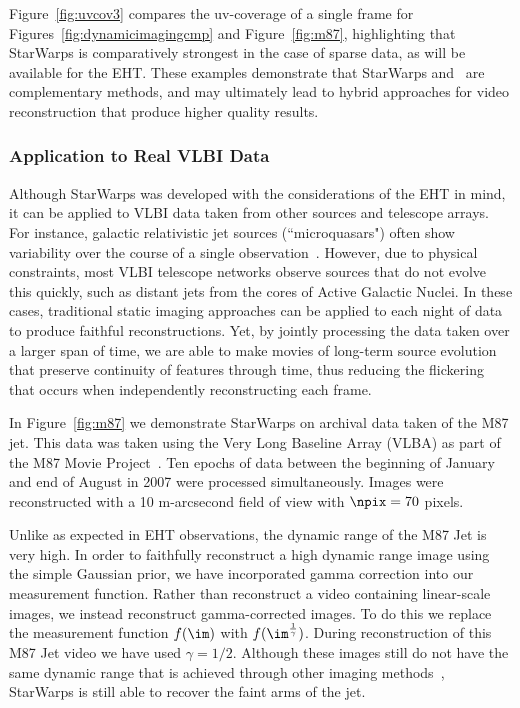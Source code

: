Figure~\ref{fig:uvcov3} compares the uv-coverage of a single frame for Figures~\ref{fig:dynamicimagingcmp} and Figure~\ref{fig:m87}, highlighting that StarWarps is comparatively strongest  in the case of sparse data, as will be available for the EHT. These examples demonstrate that StarWarps and~\cite{Johnson_dynamical} are complementary methods, and may ultimately lead to hybrid approaches for video reconstruction that produce higher quality results. 




 


\subsubsection{Application to Real VLBI Data}


Although StarWarps was developed with the considerations of the EHT in mind, it can be applied to VLBI data taken from other sources and telescope arrays. For instance, galactic relativistic jet sources (``microquasars") often show variability over the course of a single observation~\cite{timedeprecon}. 
However, due to physical constraints, most VLBI telescope networks observe sources that do not evolve this quickly, such as distant jets from the cores of Active Galactic Nuclei. In these cases, traditional static imaging approaches can be applied to each night of data to produce faithful reconstructions. Yet, by jointly processing the data taken over a larger span of time, we are able to make movies of long-term source evolution that preserve continuity of features through time, thus reducing the flickering that occurs when independently reconstructing each frame. 

In Figure~\ref{fig:m87} we demonstrate StarWarps on archival data taken of the M87 jet. This data was taken using the Very Long Baseline Array (VLBA) as part of the M87 Movie Project~\cite{walker2016observations}. Ten epochs of data between the beginning of January and end of August in 2007 were processed simultaneously. Images were reconstructed with a 10 m-arcsecond field of view with $\npix=70$ pixels. 

Unlike as expected in EHT observations, the dynamic range of the M87 Jet is very high. In order to faithfully reconstruct a high dynamic range image using the simple Gaussian prior, we have incorporated gamma correction into our measurement function. Rather than reconstruct a video containing linear-scale images, we instead reconstruct gamma-corrected images. To do this we replace the measurement function $f(\im)$ with $f(\im^{\frac{1}{\gamma}})$. During reconstruction of this M87 Jet video we have used $\gamma=1/2$. Although these images still do not have the same dynamic range that is achieved through other imaging methods~\cite{walker2016observations,Johnson_dynamical}, StarWarps is still able to recover the faint arms of the jet. 

